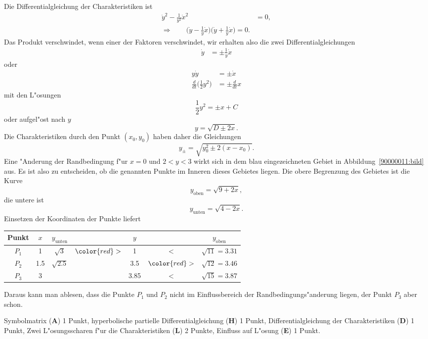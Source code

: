 \begin{loesung}
Die Differentialgleichung der Charakteristiken ist
\begin{align*}
\dot y^2-\frac{1}{y^2}\dot x^2&=0,\\
\Rightarrow\qquad
\biggl(\dot y-\frac1y\dot x\biggr)\biggl(\dot y +\frac1y\dot x\biggr)=0.
\end{align*}
Das Produkt verschwindet, wenn einer der Faktoren verschwindet, wir erhalten
also die zwei Differentialgleichungen
\begin{align*}
\dot y&=\pm \frac1y \dot x
\end{align*}
oder
\begin{align*}
y\dot y&=\pm \dot x
\\
\frac{d}{dt}\biggl(\frac12y^2\biggr)&=\pm\frac{d}{dt} x
\end{align*}
mit den L"osungen
\[
\frac12y^2=\pm x + C
\]
oder aufgel"ost nach $y$
\begin{equation}
y=\sqrt{D\pm 2x}.
\end{equation}
Die Charakteristiken durch den Punkt $(x_0,y_0)$ haben daher die Gleichungen
\[
y_\pm=\sqrt{y_0^2\pm 2(x-x_0)}.
\]
Eine "Anderung der Randbedingung f"ur $x=0$ und $2<y<3$ wirkt sich 
in dem blau eingezeichneten Gebiet in Abbildung~\ref{90000011:bild} aus.
Es ist also zu entscheiden, ob die genannten Punkte im Inneren dieses
Gebietes liegen. Die obere Begrenzung des Gebietes ist die
Kurve
\[
y_{\text{oben}} = \sqrt{9+2x},
\]
die untere ist
\[
y_{\text{unten}} = \sqrt{4-2x}.
\]
Einsetzen der Koordinaten der Punkte liefert
\begin{center}
\begin{tabular}{|c|c|ccccc|}
\hline
Punkt&$x$&$y_{\text{unten}}$&               &$y$ &              & $y_{\text{oben}}$\\
\hline
$P_1$&1  &$\sqrt{3}  $      &$\color{red}>$ & 1  &     $<$      & $\sqrt{11}=3.31$ \\
$P_2$&1.5&$\sqrt{2.5}$      &               &3.5 &$\color{red}>$& $\sqrt{12}=3.46$ \\
$P_3$&3  &                  &               &3.85&     $<$      & $\sqrt{15}=3.87$ \\
\hline
\end{tabular}
\end{center}
Daraus kann man ablesen, dass die Punkte $P_1$ und $P_2$ nicht im Einflussbereich
der Randbedingungs"anderung liegen, der Punkt $P_3$ aber schon.
\end{loesung}

\begin{bewertung}
Symbolmatrix ({\bf A}) 1 Punkt,
hyperbolische partielle Differentialgleichung ({\bf H}) 1 Punkt,
Differentialgleichung der Charakteristiken ({\bf D}) 1 Punkt,
Zwei L"osungsscharen f"ur die Charakteristiken ({\bf L}) 2 Punkte,
Einfluss auf L"osung ({\bf E}) 1 Punkt.
\end{bewertung}



